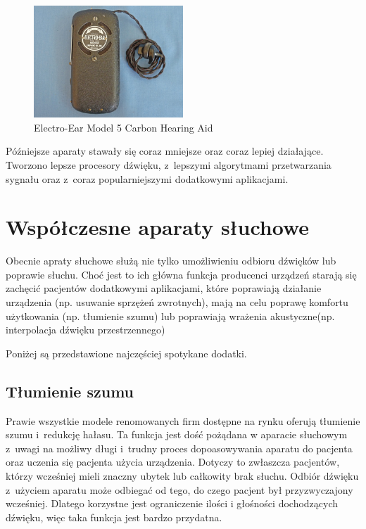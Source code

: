 \documentclass[journal]{IEEEtran}
\begin{document}
\begin{figure}
    \includegraphics[width=0.5\textwidth]{electroear}
    \caption{Electro-Ear Model 5 Carbon Hearing Aid}
    \label{fig:electroear}
\end{figure}

Późniejsze aparaty stawały się coraz mniejsze oraz coraz lepiej działające. Tworzono lepsze procesory dźwięku, z~lepszymi algorytmami przetwarzania sygnału oraz z~coraz popularniejszymi dodatkowymi aplikacjami.

\section{Współczesne aparaty słuchowe}

Obecnie apraty słuchowe służą nie tylko umożliwieniu odbioru dźwięków lub poprawie słuchu. Choć jest to ich główna funkcja producenci urządzeń starają się zachęcić pacjentów dodatkowymi aplikacjami, które poprawiają działanie urządzenia (np. usuwanie sprzężeń zwrotnych), mają na celu poprawę komfortu użytkowania (np. tłumienie szumu) lub poprawiają wrażenia akustyczne(np. interpolacja dźwięku przestrzennego)

Poniżej są przedstawione najczęściej spotykane dodatki.

\subsection{Tłumienie szumu}

Prawie wszystkie modele renomowanych firm dostępne na rynku oferują tłumienie szumu i~redukcję hałasu. Ta funkcja jest dość pożądana w aparacie słuchowym z~uwagi na możliwy długi i~trudny proces dopoasowywania aparatu do pacjenta oraz uczenia się pacjenta użycia urządzenia. Dotyczy to zwłaszcza pacjentów, którzy wcześniej mieli znaczny ubytek lub całkowity brak słuchu. Odbiór dźwięku z~użyciem aparatu może odbiegać od tego, do czego pacjent był przyzwyczajony wcześniej. Dlatego korzystne jest ograniczenie ilości i głośności dochodzących dźwięku, więc taka funkcja jest bardzo przydatna.
\end{document}
